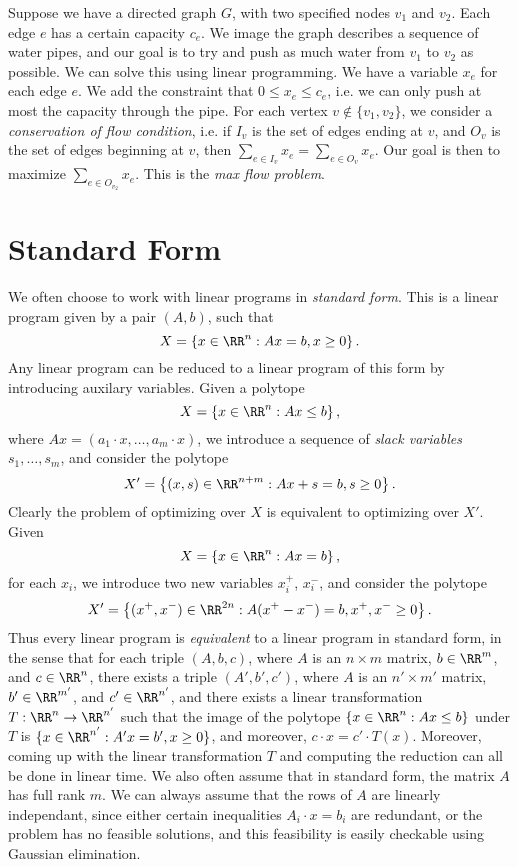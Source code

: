 \begin{example}
    Suppose we have a directed graph $G$, with two specified nodes $v_1$ and $v_2$. Each edge $e$ has a certain capacity $c_e$. We image the graph describes a sequence of water pipes, and our goal is to try and push as much water from $v_1$ to $v_2$ as possible. We can solve this using linear programming. We have a variable $x_e$ for each edge $e$. We add the constraint that $0 \leq x_e \leq c_e$, i.e. we can only push at most the capacity through the pipe. For each vertex $v \not \in \{ v_1, v_2 \}$, we consider a \emph{conservation of flow condition}, i.e. if $I_v$ is the set of edges ending at $v$, and $O_v$ is the set of edges beginning at $v$, then $\sum_{e \in I_v} x_e = \sum_{e \in O_v} x_e$. Our goal is then to maximize $\sum_{e \in O_{v_2}} x_e$. This is the \emph{max flow problem}.
\end{example}

\section{Standard Form}

We often choose to work with linear programs in \emph{standard form}. This is a linear program given by a pair $(A,b)$, such that
%
\[ X = \left\{ x \in \RR^n: Ax = b, x \geq 0 \right\}. \]
%
Any linear program can be reduced to a linear program of this form by introducing auxilary variables. Given a polytope
%
\[ X = \left\{ x \in \RR^n: Ax \leq b \right\}, \]
%
where $Ax = (a_1 \cdot x, \dots, a_m \cdot x)$, we introduce a sequence of \emph{slack variables} $s_1, \dots, s_m$, and consider the polytope
%
\[ X' = \left\{ (x,s) \in \RR^{n+m}: Ax + s = b, s \geq 0 \right\}. \]
%
Clearly the problem of optimizing over $X$ is equivalent to optimizing over $X'$. Given
%
\[ X = \left\{ x \in \RR^n:  Ax = b \right\}, \]
%
for each $x_i$, we introduce two new variables $x_i^+$, $x_i^-$, and consider the polytope
%
\[ X' = \left\{ (x^+,x^-) \in \RR^{2n}: A(x^+ - x^-) = b, x^+, x^- \geq 0 \right\}. \]
%
Thus every linear program is \emph{equivalent} to a linear program in standard form, in the sense that for each triple $(A,b,c)$, where $A$ is an $n \times m$ matrix, $b \in \RR^m$, and $c \in \RR^n$, there exists a triple $(A',b',c')$, where $A$ is an $n' \times m'$ matrix, $b' \in \RR^{m'}$, and $c' \in \RR^{n'}$, and there exists a linear transformation $T: \RR^n \to \RR^{n'}$ such that the image of the polytope $\{ x \in \RR^n: Ax \leq b \}$ under $T$ is $\{ x \in \RR^{n'}: A'x = b', x \geq 0 \}$, and moreover, $c \cdot x = c' \cdot T(x)$. Moreover, coming up with the linear transformation $T$ and computing the reduction can all be done in linear time. We also often assume that in standard form, the matrix $A$ has full rank $m$. We can always assume that the rows of $A$ are linearly independant, since either certain inequalities $A_i \cdot x = b_i$ are redundant, or the problem has no feasible solutions, and this feasibility is easily checkable using Gaussian elimination.

